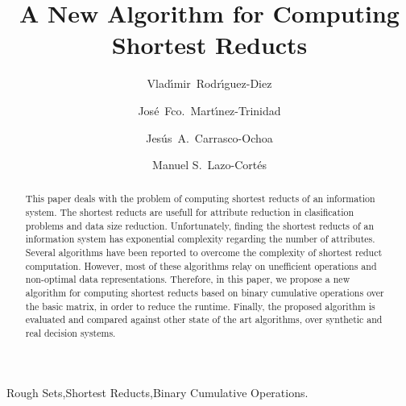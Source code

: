\documentclass[number,preprint,review,12pt]{elsarticle}
\begin{document}
	\title{A New Algorithm for Computing Shortest Reducts}
	
	\author[inaoe,uc]{Vlad\'{\i}mir~Rodr\'{\i}guez-Diez}
	\author[inaoe]{Jos\'{e}~Fco.~Mart\'{\i}nez-Trinidad}
	\author[inaoe]{Jes\'{u}s~A.~Carrasco-Ochoa}	
	\author[inaoe]{Manuel S.~Lazo-Cort\'{e}s}
	\address[inaoe]{Computer Science Department\\
					Instituto Nacional de Astrof\'{\i}sica, \'{O}ptica y Electr\'{o}nica\\
					Luis Enrique Erro \# 1, Santa Mar\'{\i}a Tonantzintla, Puebla, 72840, M\'{e}xico} 
	\address[uc]{Electrical Engineering Department\\
				 Universidad de Camag\"{u}ey\\
				 Circv. Nte. km 5$\frac{1}{2}$, Camag\"{u}ey, Cuba}
	
	\begin{abstract}
		This paper deals with the problem of computing shortest reducts of an information system. The shortest reducts are usefull for attribute reduction in clasification problems and data size reduction. Unfortunately, finding the shortest reducts of an information system has exponential complexity regarding the number of attributes. Several algorithms have been reported to overcome the complexity of shortest reduct computation. However, most of these algorithms relay on unefficient operations and non-optimal data representations. Therefore, in this paper, we propose a new algorithm for computing shortest reducts based on binary cumulative operations over the basic matrix, in order to reduce the runtime. Finally, the proposed algorithm is evaluated and compared against other state of the art algorithms, over synthetic and real decision systems.
	\end{abstract}
	
	\begin{keyword}
		Rough Sets\sep Shortest Reducts\sep Binary Cumulative Operations.
	\end{keyword}

	\maketitle

\end{document}
